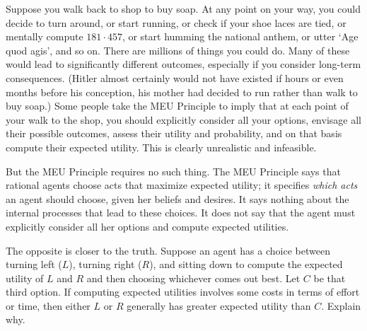 Suppose you walk back to shop to buy soap. At any point on your way,
you could decide to turn around, or start running, or check if your
shoe laces are tied, or mentally compute $181 \cdot 457$, or start humming
the national anthem, or utter `Age quod agis', and so on. There are
millions of things you could do. Many of these would lead to
significantly different outcomes, especially if you consider long-term
consequences. (Hitler almost certainly would not have existed if hours
or even months before his conception, his mother had decided to run
rather than walk to buy soap.) Some people take the MEU Principle to
imply that at each point of your walk to the shop, you should
explicitly consider all your options, envisage all their possible
outcomes, assess their utility and probability, and on that basis
compute their expected utility. This is clearly unrealistic and
infeasible.

But the MEU Principle requires no such thing. The MEU Principle says
that rational agents choose acts that maximize expected utility; it
specifies \emph{which acts} an agent should choose, given her beliefs
and desires. It says nothing about the internal processes that lead to
these choices. It does not say that the agent must
explicitly consider all her options and compute expected utilities.

\begin{exercise}{2}
  The opposite is closer to the truth. Suppose an agent has a choice
  between turning left ($L$), turning right ($R$), and sitting down to
  compute the expected utility of $L$ and $R$ and then choosing
  whichever comes out best. Let $C$ be that third option. If computing
  expected utilities involves some costs in terms of effort or time,
  then either $L$ or $R$ generally has greater expected utility than
  $C$. Explain why.
\end{exercise}

